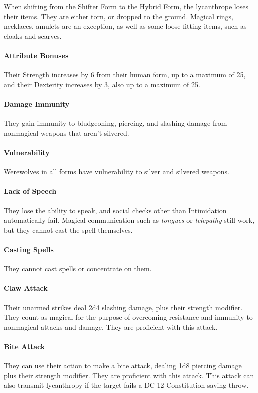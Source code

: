 \documentclass[twocolumn]{dndbook}
\begin{document}
When shifting from the Shifter Form to the Hybrid Form, the lycanthrope loses their items. They are either torn, or dropped to the ground.
Magical rings, necklaces, amulets are an exception, as well as some loose-fitting items, such as cloaks and scarves.\par

\paragraph*{Attribute Bonuses} Their Strength increases by 6 from their human form, up to a maximum of 25, and their Dexterity increases by 3, also up to a maximum of 25.
\paragraph*{Damage Immunity} They gain immunity to bludgeoning, piercing, and slashing damage from nonmagical weapons that aren't silvered.
\paragraph*{Vulnerability} Werewolves in all forms have vulnerability to silver and silvered weapons.
\paragraph*{Lack of Speech} They lose the ability to speak, and social checks other than Intimidation automatically fail.
Magical communication such as \emph{tongues} or \emph{telepathy} still work, but they cannot cast the spell themselves.
\paragraph*{Casting Spells} They cannot cast spells or concentrate on them.
\paragraph*{Claw Attack} Their unarmed strikes deal 2d4 slashing damage, plus their strength modifier. They count as magical for the purpose of overcoming resistance and immunity to nonmagical attacks and damage. They are proficient with this attack.
\paragraph*{Bite Attack} They can use their action to make a bite attack, dealing 1d8 piercing damage plus their strength modifier. They are proficient with this attack. This attack can also transmit lycanthropy if the target fails a DC 12 Constitution saving throw.
\end{document}
